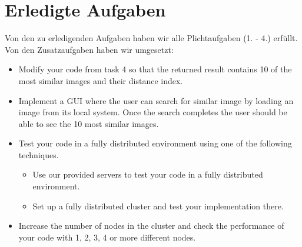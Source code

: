 \documentclass[paper=a4, fontsize=11pt]{scrartcl} %
\numberwithin{equation}{section} %
\numberwithin{figure}{section} %
\numberwithin{table}{section} %
\begin{document}
\section{Erledigte Aufgaben}
Von den zu erledigenden Aufgaben haben wir alle Plichtaufgaben (1. - 4.) erfüllt. Von den Zusatzaufgaben haben wir umgesetzt:

\begin{itemize}
\item Modify your code from task 4 so that the returned result contains 10 of the most similar images and their distance index.
\item Implement a GUI where the user can search for similar image by loading an image
from its local system. Once the search completes the user should be able to see the
10 most similar images.
\item Test your code in a fully distributed environment using one of the following
techniques.
	\begin{itemize}
	\item Use our provided servers to test your code in a fully distributed environment.
	\item Set up a fully distributed cluster and test your implementation there.
	\end{itemize}
\item Increase the number of nodes in the cluster and check the performance of your code
with 1, 2, 3, 4 or more different nodes.
\end{itemize}
\end{document}
